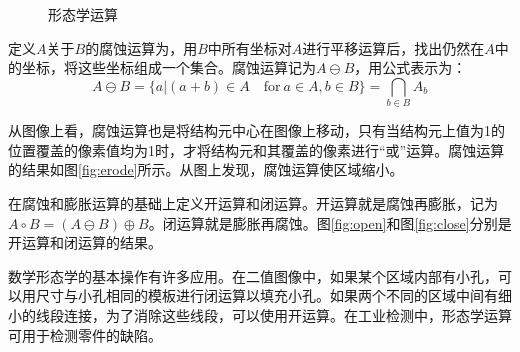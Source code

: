 \begin{figure}[h]
  \centering
  \hspace{1cm}
    \\
    \hspace{1cm}
    \\
  \hspace{1cm}
  \caption{形态学运算}
\end{figure}

定义$A$关于$B$的腐蚀运算为，用$B$中所有坐标对$A$进行平移运算后，找出仍然在$A$中的坐标，将这些坐标组成一个集合。腐蚀运算记为$A\ominus B$，用公式表示为：
\begin{equation}
  \label{eq:erode}
  A\ominus B=\{a|(a+b)\in A\quad\textrm{for}\ a\in A,b\in B\}=\bigcap_{b\in B}A_b
\end{equation}

从图像上看，腐蚀运算也是将结构元中心在图像上移动，只有当结构元上值为1的位置覆盖的像素值均为1时，才将结构元和其覆盖的像素进行“或”运算。腐蚀运算的结果如图\ref{fig:erode}所示。从图上发现，腐蚀运算使区域缩小。

在腐蚀和膨胀运算的基础上定义开运算和闭运算。开运算就是腐蚀再膨胀，记为$A\circ B=(A\ominus B)\oplus B$。闭运算就是膨胀再腐蚀。图\ref{fig:open}和图\ref{fig:close}分别是开运算和闭运算的结果。


数学形态学的基本操作有许多应用。在二值图像中，如果某个区域内部有小孔，可以用尺寸与小孔相同的模板进行闭运算以填充小孔。如果两个不同的区域中间有细小的线段连接，为了消除这些线段，可以使用开运算。在工业检测中，形态学运算可用于检测零件的缺陷。

